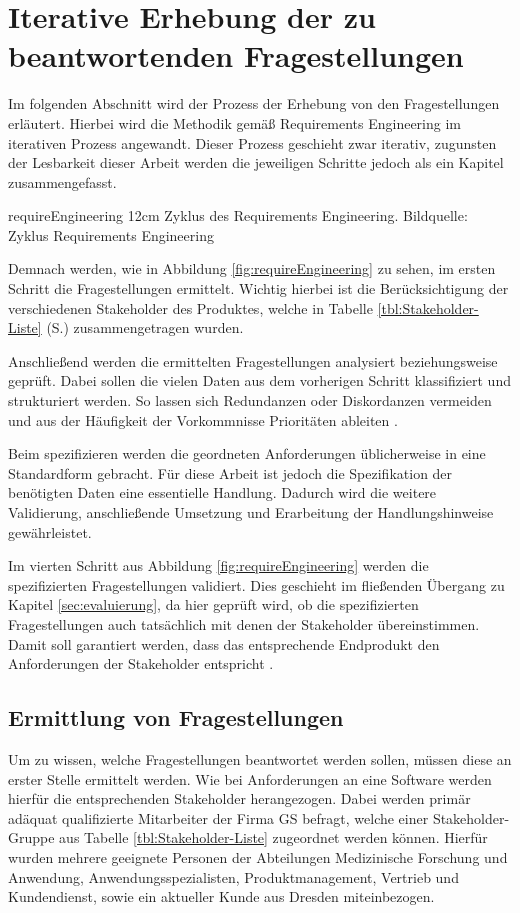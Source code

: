 \section{Iterative Erhebung der zu beantwortenden Fragestellungen}
Im folgenden Abschnitt wird der Prozess der Erhebung von den Fragestellungen erläutert.
Hierbei wird die Methodik gemäß Requirements Engineering \cite{Pohl.2011} im iterativen Prozess angewandt.
Dieser Prozess geschieht zwar iterativ, zugunsten der Lesbarkeit dieser Arbeit werden die jeweiligen Schritte jedoch als ein Kapitel zusammengefasst.

\bild
{requireEngineering}
{12cm}
{Zyklus des Requirements Engineering. Bildquelle: \cite{Patig.}}
{Zyklus Requirements Engineering}

Demnach werden, wie in Abbildung \ref{fig:requireEngineering} zu sehen, im ersten Schritt die Fragestellungen ermittelt.
Wichtig hierbei ist die Berücksichtigung der verschiedenen Stakeholder des Produktes, welche in Tabelle \ref{tbl:Stakeholder-Liste} (S.\pageref{tbl:Stakeholder-Liste}) zusammengetragen wurden.

Anschließend werden die ermittelten Fragestellungen analysiert beziehungsweise geprüft.
Dabei sollen die vielen Daten aus dem vorherigen Schritt klassifiziert und strukturiert werden.
So lassen sich Redundanzen oder Diskordanzen vermeiden und aus der Häufigkeit der Vorkommnisse Prioritäten ableiten \cite[S.100f]{Sommerville.2012}.

Beim spezifizieren werden die geordneten Anforderungen üblicherweise in eine Standardform gebracht.
Für diese Arbeit ist jedoch die Spezifikation der benötigten Daten eine essentielle Handlung.
Dadurch wird die weitere Validierung, anschließende Umsetzung und Erarbeitung der Handlungshinweise gewährleistet.

Im vierten Schritt aus Abbildung \ref{fig:requireEngineering} werden die spezifizierten Fragestellungen validiert.
Dies geschieht im fließenden Übergang zu Kapitel \ref{sec:evaluierung}, da hier geprüft wird, ob die spezifizierten Fragestellungen auch tatsächlich mit denen der Stakeholder übereinstimmen.
Damit soll garantiert werden, dass das entsprechende Endprodukt den Anforderungen der Stakeholder entspricht \cite{Patig.}.


\subsection{Ermittlung von Fragestellungen}
Um zu wissen, welche Fragestellungen beantwortet werden sollen, müssen diese an erster Stelle ermittelt werden.
Wie bei Anforderungen an eine Software werden hierfür die entsprechenden Stakeholder herangezogen.
Dabei werden primär adäquat qualifizierte Mitarbeiter der Firma \gls{GS} befragt, welche einer Stakeholder-Gruppe aus Tabelle \ref{tbl:Stakeholder-Liste} zugeordnet werden können.
Hierfür wurden mehrere geeignete Personen der Abteilungen \glqq Medizinische Forschung und Anwendung\grqq, Anwendungsspezialisten, Produktmanagement, Vertrieb und Kundendienst, sowie ein aktueller Kunde aus Dresden miteinbezogen.

